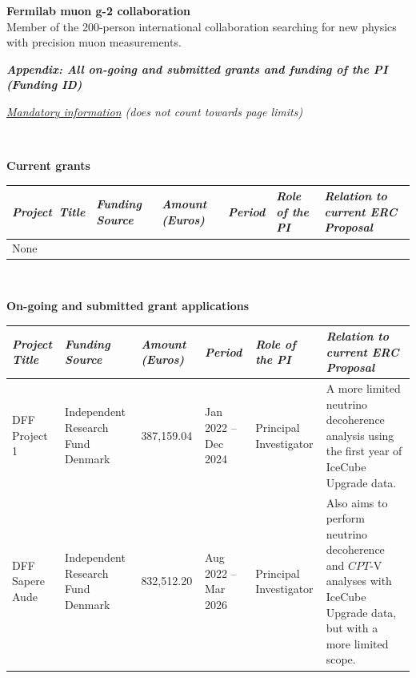 \documentclass[a4paper,11pt]{article}
\renewcommand{\smallskip} {\vspace{0.1in}}
\begin{document}
{\bf Fermilab muon g-2 collaboration} \\ 
Member of the 200-person international collaboration searching for new physics with precision muon measurements.


%
\newpage 




\centerline{ {\textit{\textbf{ Appendix: All on-going and submitted grants and funding of the PI (Funding ID)}}
}} \smallskip
\centerline{ \it \underline{Mandatory information} (does not count towards page limits)
}\smallskip

~\vspace{2cm}

{\bf Current grants}
\begin{table}[h]
\centering
\begin{tabularx}{1\textwidth}{|C{0.125\textwidth}|C{0.125\textwidth}|C{0.1\textwidth}|C{0.115\textwidth}|C{0.115\textwidth}|C{0.26\textwidth}|}
\hline
{} \it Project~Title & \it Funding Source & \it Amount (Euros) & \it Period & \it Role of the PI & \it Relation to current ERC Proposal\\
\hline
None  & & & & & \\
\hline
\end{tabularx}
\end{table}

~\vspace{2cm}


{\bf On-going and submitted grant applications}
\begin{table}[h]
\centering
\begin{tabularx}{1\textwidth}{|C{0.125\textwidth}|C{0.125\textwidth}|C{0.1\textwidth}|C{0.115\textwidth}|C{0.115\textwidth}|C{0.26\textwidth}|}
\hline
{} \it  Project Title & \it Funding Source & \it Amount (Euros) & \it Period & \it Role of the PI & \it Relation to current ERC Proposal\\
\hline
DFF Project 1 & Independent Research Fund Denmark & 387,159.04 & Jan 2022 -- Dec 2024 & Principal Investigator & A more limited neutrino decoherence analysis using the first year of IceCube Upgrade data. \\
\hline
DFF Sapere Aude & Independent Research Fund Denmark & 832,512.20 & Aug 2022 -- Mar 2026 & Principal Investigator & Also aims to perform neutrino decoherence and $CPT$-V analyses with IceCube Upgrade data, but with a more limited scope. \\
\hline
\end{tabularx}
\end{table}
\end{document}
